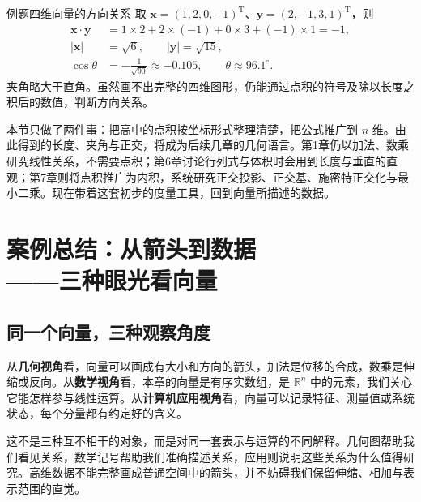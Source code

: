 \documentclass[a4paper,12pt,twoside,openany,fontset=none]{ctexbook}
\newcounter{example}[chapter]
\newenvironment{example}[1][]{\begin{exBox}{例题}{#1}}{\end{exBox}}
\numberwithin{equation}{chapter}
\begin{document}
\begin{example}[四维向量的方向关系]
取 $\boldsymbol{x}=(1,2,0,-1)^{\mathrm T}$、$\boldsymbol{y}=(2,-1,3,1)^{\mathrm T}$，则
\begin{align}
 \boldsymbol{x}\cdot\boldsymbol{y}&=1\times2+2\times(-1)+0\times3+(-1)\times1=-1,\\
 |\boldsymbol{x}|&=\sqrt6,\qquad |\boldsymbol{y}|=\sqrt{15},\\
 \cos\theta&=-\frac1{\sqrt{90}}\approx-0.105,\qquad \theta\approx96.1^\circ.
\end{align}
夹角略大于直角。虽然画不出完整的四维图形，仍能通过点积的符号及除以长度之积后的数值，判断方向关系。
\end{example}

本节只做了两件事：把高中的点积按坐标形式整理清楚，把公式推广到 $n$ 维。由此得到的长度、夹角与正交，将成为后续几章的几何语言。第1章仍以加法、数乘研究线性关系，不需要点积；第6章讨论行列式与体积时会用到长度与垂直的直观；第7章则将点积推广为内积，系统研究正交投影、正交基、施密特正交化与最小二乘。现在带着这套初步的度量工具，回到向量所描述的数据。


\clearpage
\section[案例总结：从箭头到数据——三种眼光看向量]{案例总结：从箭头到数据\\——三种眼光看向量}
\label{sec:zero-video}

\subsection*{同一个向量，三种观察角度}

从\textbf{几何视角}看，向量可以画成有大小和方向的箭头，加法是位移的合成，数乘是伸缩或反向。从\textbf{数学视角}看，本章的向量是有序实数组，是 $\mathbb{R}^n$ 中的元素，我们关心它能怎样参与线性运算。从\textbf{计算机应用视角}看，向量可以记录特征、测量值或系统状态，每个分量都有约定好的含义。

这不是三种互不相干的对象，而是对同一套表示与运算的不同解释。几何图帮助我们看见关系，数学记号帮助我们准确描述关系，应用则说明这些关系为什么值得研究。高维数据不能完整画成普通空间中的箭头，并不妨碍我们保留伸缩、相加与表示范围的直觉。
\end{document}
